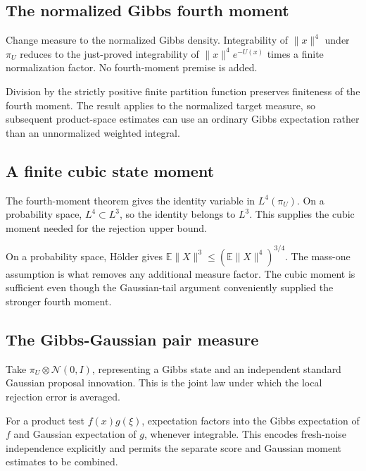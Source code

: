 \documentclass[11pt,a4paper]{article}
\begin{document}
\subsection{\texorpdfstring{The normalized Gibbs fourth moment}{The normalized Gibbs fourth moment}}


Change measure to the normalized Gibbs density. Integrability of \(\|x\|^4\) under \(\pi_U\) reduces to the just-proved integrability of \(\|x\|^4e^{-U(x)}\) times a finite normalization factor. No fourth-moment premise is added.



Division by the strictly positive finite partition function preserves finiteness of the fourth moment. The result applies to the normalized target measure, so subsequent product-space estimates can use an ordinary Gibbs expectation rather than an unnormalized weighted integral.


\subsection{\texorpdfstring{A finite cubic state moment}{A finite cubic state moment}}


The fourth-moment theorem gives the identity variable in \(L^4(\pi_U)\). On a probability space, \(L^4\subset L^3\), so the identity belongs to \(L^3\). This supplies the cubic moment needed for the rejection upper bound.



On a probability space, Hölder gives \(\mathbb E\|X\|^3\le(\mathbb E\|X\|^4)^{3/4}\). The mass-one assumption is what removes any additional measure factor. The cubic moment is sufficient even though the Gaussian-tail argument conveniently supplied the stronger fourth moment.


\subsection{\texorpdfstring{The Gibbs-Gaussian pair measure}{The Gibbs-Gaussian pair measure}}


Take \(\pi_U\otimes\mathcal N(0,I)\), representing a Gibbs state and an independent standard Gaussian proposal innovation. This is the joint law under which the local rejection error is averaged.



For a product test \(f(x)g(\xi)\), expectation factors into the Gibbs expectation of \(f\) and Gaussian expectation of \(g\), whenever integrable. This encodes fresh-noise independence explicitly and permits the separate score and Gaussian moment estimates to be combined.
\end{document}
